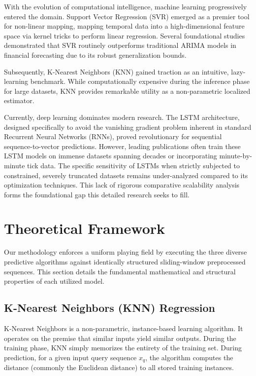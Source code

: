 \documentclass[12pt,onecolumn]{IEEEtran}
\begin{document}
With the evolution of computational intelligence, machine learning progressively entered the domain. Support Vector Regression (SVR) emerged as a premier tool for non-linear mapping, mapping temporal data into a high-dimensional feature space via kernel tricks to perform linear regression. Several foundational studies demonstrated that SVR routinely outperforms traditional ARIMA models in financial forecasting due to its robust generalization bounds.

Subsequently, K-Nearest Neighbors (KNN) gained traction as an intuitive, lazy-learning benchmark. While computationally expensive during the inference phase for large datasets, KNN provides remarkable utility as a non-parametric localized estimator.

Currently, deep learning dominates modern research. The LSTM architecture, designed specifically to avoid the vanishing gradient problem inherent in standard Recurrent Neural Networks (RNNs), proved revolutionary for sequential sequence-to-vector predictions. However, leading publications often train these LSTM models on immense datasets spanning decades or incorporating minute-by-minute tick data. The specific sensitivity of LSTMs when strictly subjected to constrained, severely truncated datasets remains under-analyzed compared to its optimization techniques. This lack of rigorous comparative scalability analysis forms the foundational gap this detailed research seeks to fill.

\section{Theoretical Framework}
Our methodology enforces a uniform playing field by executing the three diverse predictive algorithms against identically structured sliding-window preprocessed sequences. This section details the fundamental mathematical and structural properties of each utilized model.

\subsection{K-Nearest Neighbors (KNN) Regression}
K-Nearest Neighbors is a non-parametric, instance-based learning algorithm. It operates on the premise that similar inputs yield similar outputs. During the training phase, KNN simply memorizes the entirety of the training set. During prediction, for a given input query sequence $x_q$, the algorithm computes the distance (commonly the Euclidean distance) to all stored training instances. 
\end{document}
